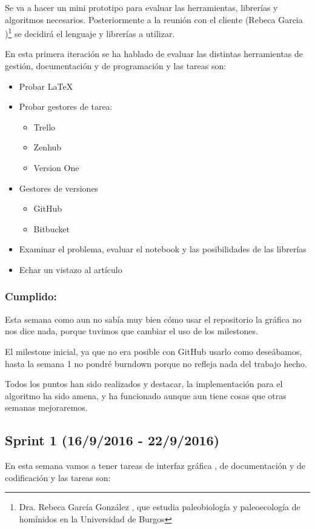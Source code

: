 Se va a hacer un mini prototipo para evaluar las herramientas, librerías y algoritmos necesarios. Posteriormente a la reunión con el cliente (Rebeca Garcia \cite{Rebeca:garcia})\footnote{ Dra. Rebeca García González \cite{ubu:Rebe},  que estudia paleobiología y paleoecología de homínidos en la Universidad de Burgos} se decidirá el lenguaje y librerías a utilizar.

En esta primera iteración se ha hablado de evaluar las distintas herramientas de gestión, documentación y de programación y las tareas son:


\begin{itemize}
	\item Probar \LaTeX 
	\item Probar gestores de tarea: 
	\begin{itemize}
	\item Trello 
	\item Zenhub 
	\item Version One
	\end{itemize}
	\item Gestores de versiones 
	\begin{itemize}
	\item GitHub 
	\item Bitbucket 
	\end{itemize}
	\item Examinar el problema, evaluar el notebook y las posibilidades de las librerías 
	\item Echar un vistazo al artículo 
\end{itemize}

\subsubsection{Cumplido:}
Esta semana como aun no sabía muy bien cómo usar el repositorio  la gráfica no nos dice nada, porque tuvimos que cambiar el uso de los milestones.

El milestone inicial, ya que no era posible con GitHub usarlo como deseábamos, hasta la semana 1 no pondré burndown porque no refleja nada del trabajo hecho.

Todos los puntos han sido realizados y destacar, la implementación para el algoritmo ha sido amena, y ha funcionado aunque aun tiene cosas que otras semanas mejoraremos.

\subsection{Sprint 1 (16/9/2016 - 22/9/2016)}
 En esta semana vamos a tener tareas de interfaz gráfica , de documentación y de codificación y las tareas son:

